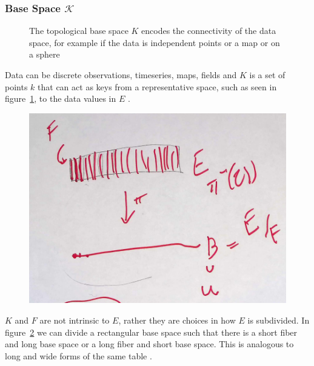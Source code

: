 \documentclass[../main.tex]{subfiles}
\begin{document}
\subsubsection{Base Space $\mathcal{K}$}
\label{sec:base_data}
\begin{figure}[H]
    \label{fig:base_space_types}
    \caption{The topological base space $K$ encodes the connectivity of the data space, for example if the data is independent points or a map or on a sphere}
\end{figure}

Data can be discrete observations, timeseries, maps, fields \cite{munznerWhatDataAbstraction2014} and $K$ is a set of points $k$ that can act as keys from a representative space, such as seen in figure~\ref{fig:base_space_types}, to the data values in $E$ \cite{munznerWhatDataAbstraction2014}.


\begin{figure}[H]
    \label{fig:base_space_div}
    \includegraphics[width=.5\linewidth]{figures/sections/math/k_qspace.png}
\end{figure}

$K$ and $F$ are not intrinsic to $E$, rather they are choices in how $E$ is subdivided\cite{QuotientSpaceTopology2020,QuotientSpaceTopology2020}. In figure~\ref{fig:base_space_div} we can divide a rectangular base space such that there is a short fiber and long base space or a long fiber and short base space. This is analogous to long and wide forms of the same table \cite{wickham2014tidy}.
\end{document}
